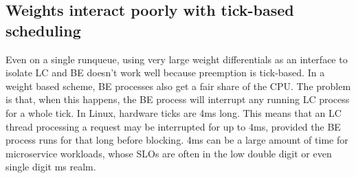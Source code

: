 \subsection{Weights interact poorly with tick-based
scheduling}\label{ss:problem:quantum}

Even on a single runqueue, using very large weight differentials as an interface
to isolate LC and BE doesn't work well because preemption is tick-based. In a
weight based scheme, BE processes also get a fair share of the CPU. The problem
is that, when this happens, the BE process will interrupt any running LC process
for a whole tick. In Linux, hardware ticks are 4ms long. This means that an LC
thread processing a request may be interrupted for up to 4ms, provided the BE
process runs for that long before blocking. 4ms can be a large amount of time
for microservice workloads, whose SLOs are often in the low double digit or even
single digit ms realm.~\cite{TODO}



